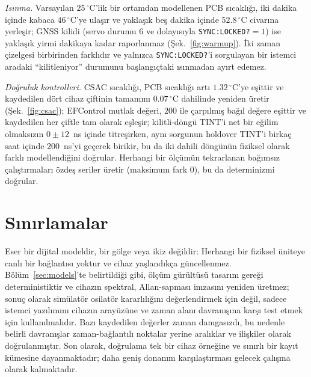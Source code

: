 \documentclass[9pt,twocolumn,a4paper]{extarticle}
\begin{document}
\emph{Isınma.} Varsayılan $25\,^\circ$C'lik bir ortamdan modellenen PCB sıcaklığı, iki dakika içinde kabaca $46\,^\circ$C'ye ulaşır ve yaklaşık beş dakika içinde $52.8\,^\circ$C civarına yerleşir; GNSS kilidi (servo durumu $6$ ve dolayısıyla \texttt{SYNC:LOCKED?}$=1$) ise yaklaşık yirmi dakikaya kadar raporlanmaz (Şek.~\ref{fig:warmup}). İki zaman çizelgesi birbirinden farklıdır ve yalnızca \texttt{SYNC:LOCKED?}'i sorgulayan bir istemci aradaki ``kilitleniyor'' durumunu başlangıçtaki ısınmadan ayırt edemez.

\emph{Doğruluk kontrolleri.} CSAC sıcaklığı, PCB sıcaklığı artı $1.32\,^\circ$C'ye eşittir ve kaydedilen dört cihaz çiftinin tamamını $0.07\,^\circ$C dahilinde yeniden üretir (Şek.~\ref{fig:csac}); EFControl mutlak değeri, $200$ ile çarpılmış bağıl değere eşittir ve kaydedilen her çiftle tam olarak eşleşir; kilitli-döngü TINT'i net bir eğilim olmaksızın $0 \pm 12$~ns içinde titreşirken, aynı sorgunun holdover TINT'i birkaç saat içinde $200$~ns'yi geçerek birikir, bu da iki dahili döngünün fiziksel olarak farklı modellendiğini doğrular. Herhangi bir ölçümün tekrarlanan bağımsız çalıştırmaları özdeş seriler üretir (maksimum fark $0$), bu da determinizmi doğrular.

\section{Sınırlamalar}
Eser bir dijital modeldir, bir gölge veya ikiz değildir: Herhangi bir fiziksel üniteye canlı bir bağlantısı yoktur ve cihaz yaşlandıkça güncellenmez. Bölüm~\ref{sec:models}'te belirtildiği gibi, ölçüm gürültüsü tasarım gereği deterministiktir ve cihazın spektral, Allan-sapması imzasını yeniden üretmez; sonuç olarak simülatör osilatör kararlılığını değerlendirmek için değil, sadece istemci yazılımını cihazın arayüzüne ve zaman alanı davranışına karşı test etmek için kullanılmalıdır. Bazı kaydedilen değerler zaman damgasızdı, bu nedenle belirli davranışlar zaman-bağlantılı noktalar yerine aralıklar ve ilişkiler olarak doğrulanmıştır. Son olarak, doğrulama tek bir cihaz örneğine ve sınırlı bir kayıt kümesine dayanmaktadır; daha geniş donanım karşılaştırması gelecek çalışma olarak kalmaktadır.

\end{document}
